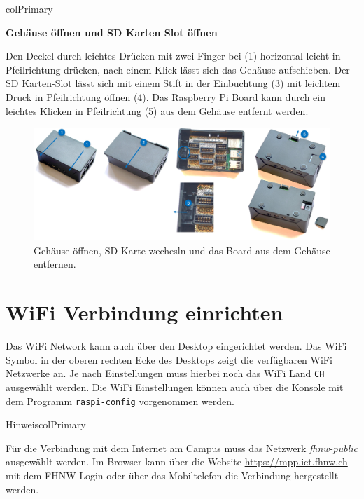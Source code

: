 \documentclass[
  11pt,
  a4paper,
  oneside, openany  ,captions=tableheading
]{scrbook}
\theoremstyle{remark}
\begin{document}
\begin{boxshade}{colPrimary}

\textbf{Gehäuse öffnen und SD Karten Slot öffnen}

Den Deckel durch leichtes Drücken mit zwei Finger bei (1) horizontal
leicht in Pfeilrichtung drücken, nach einem Klick lässt sich das Gehäuse
aufschieben. Der SD Karten-Slot lässt sich mit einem Stift in der
Einbuchtung (3) mit leichtem Druck in Pfeilrichtung öffnen (4). Das
Raspberry Pi Board kann durch ein leichtes Klicken in Pfeilrichtung (5)
aus dem Gehäuse entfernt werden.

\begin{figure}[H]

{\centering \includegraphics{images/raspberry_pi_oeffnen_sd_karte_wechseln.jpg}

}

\caption{Gehäuse öffnen, SD Karte wechesln und das Board aus dem Gehäuse
entfernen.}

\end{figure}%

\end{boxshade}

\section{WiFi Verbindung einrichten}\label{wifi-verbindung-einrichten}

Das WiFi Network kann auch über den Desktop eingerichtet werden. Das
WiFi Symbol in der oberen rechten Ecke des Desktops zeigt die
verfügbaren WiFi Netzwerke an. Je nach Einstellungen muss hierbei noch
das WiFi Land \texttt{CH} ausgewählt werden. Die WiFi Einstellungen
können auch über die Konsole mit dem Programm \texttt{raspi-config}
vorgenommen werden.

\begin{boxtitle}{Hinweis}{colPrimary}

Für die Verbindung mit dem Internet am Campus muss das Netzwerk
\emph{fhnw-public} ausgewählt werden. Im Browser kann über die Website
\url{https://mpp.ict.fhnw.ch} mit dem FHNW Login oder über das
Mobiltelefon die Verbindung hergestellt werden.

\end{boxtitle}
\end{document}
